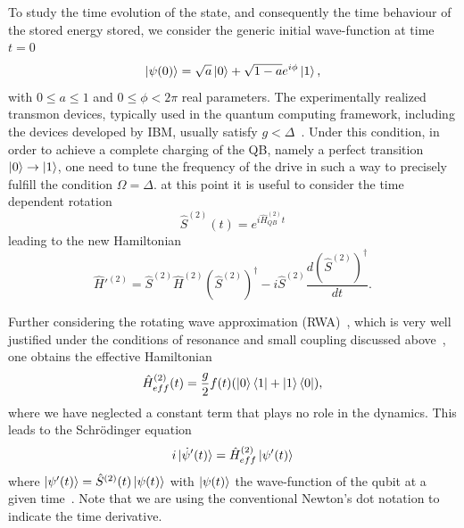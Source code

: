 \documentclass[12pt]{iopart}
\begin{document}
To study the time evolution of the state, and consequently the time behaviour of the stored energy stored, we consider the generic initial wave-function at time $t=0$~\cite{Gemme22}
\begin{equation}
\ket{\psi(0)}=\sqrt{a}\ket{0}+\sqrt{1-a}e^{i\phi}\ket{1},  
\label{Psi_general}
\end{equation}
with $0\leq a\leq 1$ and $0\leq \phi<2 \pi$ real parameters. 
The experimentally realized transmon devices, typically used in the quantum computing framework, including the devices developed by IBM, usually satisfy $g<\Delta$~\cite{Krantz19}. Under this condition, in order to achieve a complete charging of the QB, namely a perfect transition $\ket{0}\rightarrow\ket{1}$, one need to tune the frequency of the drive in such a way to precisely fulfill the condition $\Omega=\Delta$. at this point it is useful to consider the time dependent rotation
\begin{equation}
    \hat{S}^{(2)}(t)=e^{i\hat{H}_{QB}^{(2)}t}
\end{equation}
leading to the new Hamiltonian 
\begin{equation}
\hat{H}'^{(2)}=\hat{S}^{(2)}\hat{H}^{(2)}(\hat{S}^{(2)})^{\dagger}-i\hat{S}^{(2)}\frac{d(\hat{S}^{(2)})^{\dagger}}{dt}.
\label{eq:rotating_hamiltonian}
\end{equation}

Further considering the rotating wave approximation (RWA)~\cite{Schweber67, Graham84, Schleich_Book}, which is very well justified under the conditions of resonance and small coupling discussed above~\cite{Lu12}, one obtains the effective Hamiltonian
\begin{equation}
    \hat{H}^{(2)}_{eff}(t)=\frac{g}{2}f(t)(\ket{0}\bra{1}+\ket{1}\bra{0}),
\end{equation}
where we have neglected a constant term that plays no role in the dynamics. 
This leads to the Schr\"{o}dinger equation
\begin{equation}
i\ket{\dot{\psi}'(t)}=\hat{H}_{eff}^{(2)}\ket{\psi'(t)}
\end{equation}
where $\ket{\psi'(t)}=\hat{S}^{(2)}(t)\ket{\psi(t)}$ with $\ket{\psi(t)}$ the wave-function of the qubit at a given time~\cite{Gemme22}. Note that we are using the conventional Newton's dot notation to indicate the time derivative. 
\end{document}
